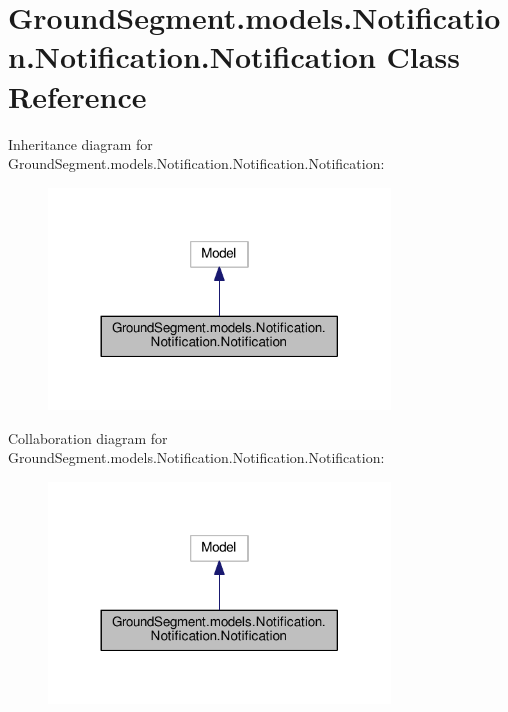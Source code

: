 \hypertarget{class_ground_segment_1_1models_1_1_notification_1_1_notification_1_1_notification}{}\section{Ground\+Segment.\+models.\+Notification.\+Notification.\+Notification Class Reference}
\label{class_ground_segment_1_1models_1_1_notification_1_1_notification_1_1_notification}


Inheritance diagram for Ground\+Segment.\+models.\+Notification.\+Notification.\+Notification\+:\nopagebreak
\begin{figure}[H]
\begin{center}
\leavevmode
\includegraphics[width=257pt]{class_ground_segment_1_1models_1_1_notification_1_1_notification_1_1_notification__inherit__graph}
\end{center}
\end{figure}


Collaboration diagram for Ground\+Segment.\+models.\+Notification.\+Notification.\+Notification\+:\nopagebreak
\begin{figure}[H]
\begin{center}
\leavevmode
\includegraphics[width=257pt]{class_ground_segment_1_1models_1_1_notification_1_1_notification_1_1_notification__coll__graph}
\end{center}
\end{figure}
